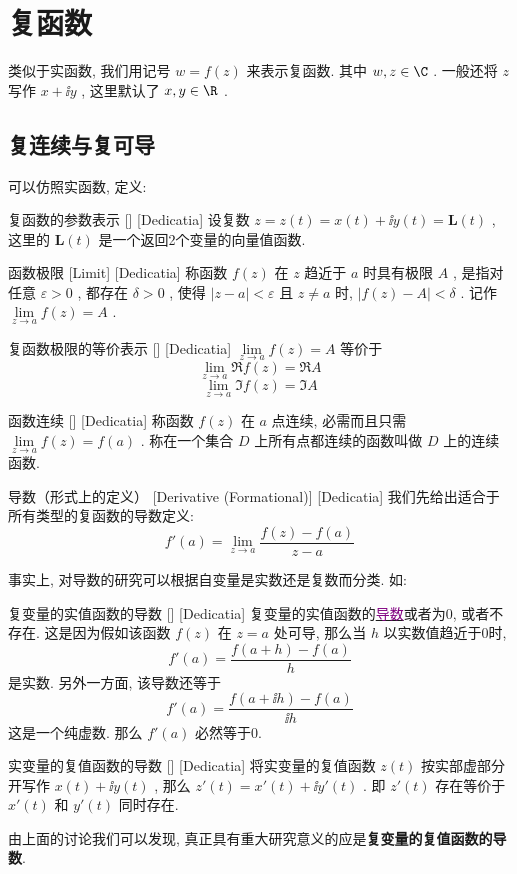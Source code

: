 \documentclass[UTF8]{ctexart}
\newcommand{\hyperrefc}[2]{\hyperref[#1]{\textcolor{purple}{#2}}}
\begin{document}
\section{复函数}
类似于实函数, 我们用记号 \( w=f(z) \) 来表示复函数. 其中 \( w,z\in\C \) . 一般还将 \( z \) 写作 \( x+\ii y \) , 这里默认了 \( x,y\in\R \) . 
\subsection{复连续与复可导}
可以仿照实函数, 定义: 
\begin{dfn}
    [UUID]
    {复函数的参数表示}
    []
    [Dedicatia]
    设复数 \( z=z(t)=x(t)+\ii y(t)=\bm{L}(t) \) , 这里的 \( \bm{L}(t) \) 是一个返回2个变量的向量值函数. 
\end{dfn}
\begin{dfn}
    [UUID]
    {函数极限}
    [Limit]
    [Dedicatia]
    称函数 \( f(z) \) 在 \( z \) 趋近于 \( a \) 时具有极限 \( A \) , 是指对任意 \( \varepsilon>0 \) , 都存在 \( \delta>0 \) , 使得 \( |z-a|<\varepsilon \) 且 \( z\neq a \) 时,  \( |f(z)-A|<\delta \) . 记作 \( \lim\limits_{z\to a}f(z)=A \) .
\end{dfn}
\begin{ppt}
    [UUID]
    {复函数极限的等价表示}
    []
    [Dedicatia]
     \( \lim\limits_{z\to a}f(z)=A \) 等价于
    \[\lim_{z\to a}\Re f(z)=\Re A\]
    \[\lim_{z\to a}\Im f(z)=\Im A\]
\end{ppt}
\begin{dfn}
    [UUID]
    {函数连续}
    []
    [Dedicatia]
    称函数 \( f(z) \) 在 \( a \) 点连续, 必需而且只需 \( \lim\limits_{z\to a}f(z)=f(a) \) . 称在一个集合 \( D \) 上所有点都连续的函数叫做 \( D \) 上的连续函数. 
\end{dfn}
\begin{dfn}
    [Derivative]
    {导数（形式上的定义）}
    [Derivative (Formational)]
    [Dedicatia]
    我们先给出适合于所有类型的复函数的导数定义: 
    \[f'(a)=\lim_{z\to a}\frac{f(z)-f(a)}{z-a}\]
\end{dfn}
事实上, 对导数的研究可以根据自变量是实数还是复数而分类. 如:
\begin{crl}
    [UUID]
    {复变量的实值函数的导数}
    []
    [Dedicatia]
    复变量的实值函数的\hyperrefc{dfn:Derivative}{导数}或者为0, 或者不存在. 这是因为假如该函数 \( f(z) \) 在 \( z=a \) 处可导, 那么当 \( h \) 以实数值趋近于0时, 
    \[f'(a)=\frac{f(a+h)-f(a)}{h}\]
    是实数. 另外一方面, 该导数还等于
    \[f'(a)=\frac{f(a+\ii h)-f(a)}{\ii h}\]
    这是一个纯虚数. 那么 \( f'(a) \) 必然等于0.
\end{crl}
\begin{xmp}
    [UUID]
    {实变量的复值函数的导数}
    []
    [Dedicatia]
    将实变量的复值函数 \( z(t) \) 按实部虚部分开写作 \( x(t)+\ii y(t) \) , 那么 \( z'(t)=x'(t)+\ii y'(t) \) . 即 \( z'(t) \) 存在等价于 \( x'(t) \) 和 \( y'(t) \) 同时存在. 
\end{xmp}
由上面的讨论我们可以发现, 真正具有重大研究意义的应是\textbf{复变量的复值函数的导数}. 
\end{document}

